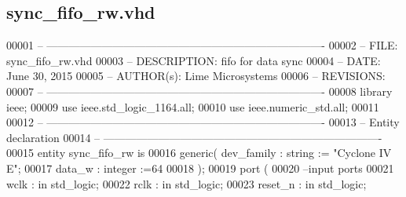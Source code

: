 \subsection{sync\+\_\+fifo\+\_\+rw.\+vhd}
\label{tx__path__top_2tx__path_2synth_2sync__fifo__rw_8vhd_source}

\begin{DoxyCode}
00001 \textcolor{keyword}{-- ---------------------------------------------------------------------------- }
00002 \textcolor{keyword}{-- FILE:    sync\_fifo\_rw.vhd}
00003 \textcolor{keyword}{-- DESCRIPTION: fifo for data sync}
00004 \textcolor{keyword}{-- DATE:    June 30, 2015}
00005 \textcolor{keyword}{-- AUTHOR(s):   Lime Microsystems}
00006 \textcolor{keyword}{-- REVISIONS:}
00007 \textcolor{keyword}{-- ---------------------------------------------------------------------------- }
00008 \textcolor{vhdlkeyword}{library }\textcolor{keywordflow}{ieee};
00009 \textcolor{vhdlkeyword}{use }ieee.std\_logic\_1164.\textcolor{keywordflow}{all};
00010 \textcolor{vhdlkeyword}{use }ieee.numeric\_std.\textcolor{keywordflow}{all};
00011 
00012 \textcolor{keyword}{-- ----------------------------------------------------------------------------}
00013 \textcolor{keyword}{-- Entity declaration}
00014 \textcolor{keyword}{-- ----------------------------------------------------------------------------}
00015 \textcolor{keywordflow}{entity }sync_fifo_rw \textcolor{keywordflow}{is}
00016   \textcolor{keywordflow}{generic}\textcolor{vhdlchar}{(} \textcolor{vhdlchar}{dev_family}   \textcolor{vhdlchar}{:} \textcolor{comment}{string}  \textcolor{vhdlchar}{:=} \textcolor{keyword}{"Cyclone IV E"};
00017               \textcolor{vhdlchar}{data_w}        \textcolor{vhdlchar}{:} \textcolor{comment}{integer} \textcolor{vhdlchar}{:=}\textcolor{vhdllogic}{}\textcolor{vhdllogic}{64}
00018   \textcolor{vhdlchar}{)};
00019   \textcolor{keywordflow}{port} \textcolor{vhdlchar}{(}
00020 \textcolor{keyword}{        --input ports }
00021         \textcolor{vhdlchar}{wclk}      \textcolor{vhdlchar}{:} \textcolor{keywordflow}{in} \textcolor{comment}{std\_logic};
00022         \textcolor{vhdlchar}{rclk}      \textcolor{vhdlchar}{:} \textcolor{keywordflow}{in} \textcolor{comment}{std\_logic};
00023         \textcolor{vhdlchar}{reset_n}   \textcolor{vhdlchar}{:} \textcolor{keywordflow}{in} \textcolor{comment}{std\_logic};

\end{DoxyCode}

